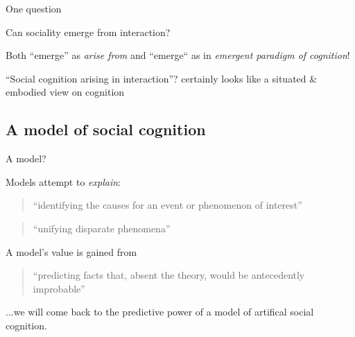 \documentclass[compress]{beamer}
\begin{document}
\begin{frame}{One question}

    \Large
    \centering

    Can sociality emerge from interaction?

    \pause
    \normalsize
    \vspace{2em}

    Both ``emerge'' as \emph{arise from} and ``emerge`` as in \emph{emergent paradigm of
    cognition}!

    \pause

    ``Social cognition arising in interaction''? certainly looks like a situated \&
    embodied view on cognition

\end{frame}

\subsection{A model of social cognition}
{
\begin{frame}{A model?}

    Models attempt to \emph{explain}: 
    \begin{quote}
        ``identifying the causes for an event or phenomenon of interest''
    \end{quote}
    \begin{quote}
        ``unifying disparate phenomena''
    \end{quote}

        A model's value is gained from
    \begin{quote}
        ``predicting facts that, absent the theory, would be antecedently
        improbable''
    \end{quote}

    \pause

    ...we will come back to the predictive power of a model of artifical social
    cognition.

\end{frame}
}
\end{document}
